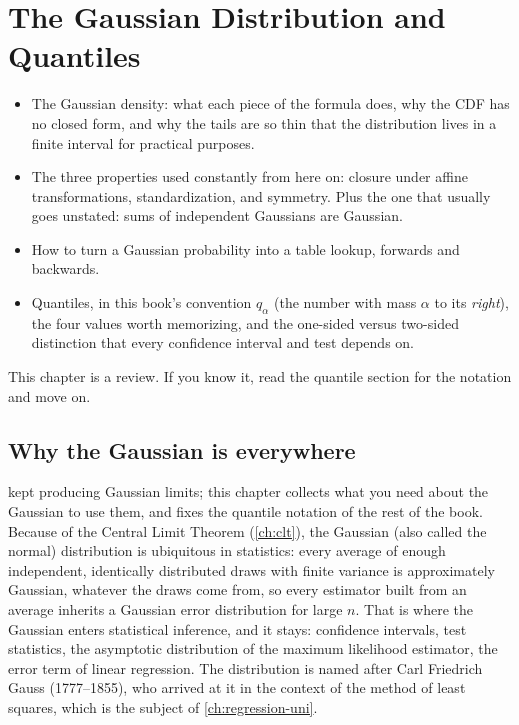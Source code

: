 \chapter{The Gaussian Distribution and Quantiles}
\label{ch:gaussian}

\begin{chaptergoals}
\begin{itemize}[nosep]
\item The Gaussian density: what each piece of the formula does, why the CDF has no closed form, and why the tails are so thin that the distribution lives in a finite interval for practical purposes.
\item The three properties used constantly from here on: closure under affine transformations, standardization, and symmetry. Plus the one that usually goes unstated: sums of independent Gaussians are Gaussian.
\item How to turn a Gaussian probability into a table lookup, forwards and backwards.
\item Quantiles, in this book's convention $q_\alpha$ (the number with mass $\alpha$ to its \textit{right}), the four values worth memorizing, and the one-sided versus two-sided distinction that every confidence interval and test depends on.
\end{itemize}
This chapter is a review. If you know it, read the quantile section for the notation and move on.
\end{chaptergoals}

\section{Why the Gaussian is everywhere}
\label{sec:gauss-why}

 kept producing Gaussian limits; this chapter collects what you need about the Gaussian to use them, and fixes the quantile notation of the rest of the book.
Because of the Central Limit Theorem (\cref{ch:clt}), the Gaussian (also called the normal) distribution is ubiquitous in statistics: every average of enough independent, identically distributed draws with finite variance is approximately Gaussian, whatever the draws come from, so every estimator built from an average inherits a Gaussian error distribution for large $n$.
That is where the Gaussian enters statistical inference, and it stays: confidence intervals, test statistics, the asymptotic distribution of the maximum likelihood estimator, the error term of linear regression.
The distribution is named after Carl Friedrich Gauss (1777--1855), who arrived at it in the context of the method of least squares, which is the subject of \cref{ch:regression-uni}.


